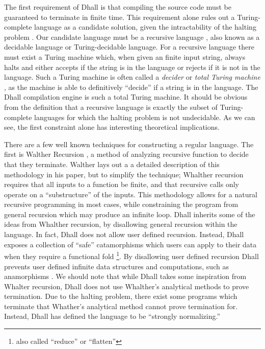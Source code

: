 \documentclass[12pt]{diazessay}
\begin{document}
The first requirement of Dhall is that compiling the source code must be guaranteed to terminate in finite time.
This requirement alone rules out a Turing-complete language as a candidate solution, given the intractability of the halting problem \cite{turing1937computable}.
Our candidate language must be a recursive language \cite{yu1997regular}, also known as a decidable language or Turing-decidable language.
For a recursive language there must exist a Turing machine which, when given an finite input string, always halts and either accepts if the string is in the language or rejects if it is not in the language.
Such a Turing machine is often called a \emph{decider} \cite{10.1145/230514.571645} or \emph{total Turing machine} \cite{kozen1997more}, as the machine is able to definitively ``decide'' if a string is in the language.
The Dhall compilation engine is such a total Turing machine.
It should be obvious from the definition that a recursive language is exactly the subset of Turing-complete languages for which the halting problem is not undecidable.
As we can see, the first constraint alone has interesting theoretical implications.

There are a few well known techniques for constructing a regular language.
The first is Walther Recursion \cite{walther1994proving}, a method of analyzing recursive function to decide that they terminate.
Walther lays out a a detailed description of this methodology in his paper, but to simplify the technique; Whalther recursion requires that all inputs to a function be finite, and that recursive calls only operate on a ``substructure'' of the inputs.
This methodology allows for a natural recursive programming in most cases, while constraining the program from general recursion which may produce an infinite loop.
Dhall inherits some of the ideas from Whalther recursion, by disallowing general recursion within the language.
In fact, Dhall does not allow user defined recursion.
Instead, Dhall exposes a collection of ``safe'' catamorphisms \cite{meijer1991functional} which users can apply to their data when they require a functional fold \footnote{also called ``reduce'' or ``flatten''}.
By disallowing user defined recursion Dhall prevents user defined infinite data structures and computations, such as anamorphisms \cite{meijer1991functional}.
We should note that while Dhall takes some inspiration from Whalter recursion, Dhall does not use Whalther's analytical methods to prove termination.
Due to the halting problem, there exist some programs which terminate that Whather's analytical method cannot prove termination for.
Instead, Dhall has defined the language to be ``strongly normalizing.''
\end{document}

